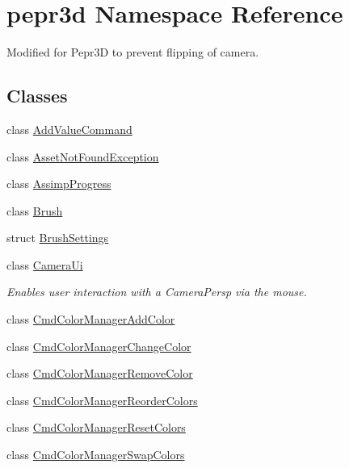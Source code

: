\hypertarget{namespacepepr3d}{}\section{pepr3d Namespace Reference}
\label{namespacepepr3d}


Modified for Pepr3D to prevent flipping of camera.  


\subsection*{Classes}
\begin{DoxyCompactItemize}
\item 
class \mbox{\hyperlink{classpepr3d_1_1_add_value_command}{Add\+Value\+Command}}
\item 
class \mbox{\hyperlink{classpepr3d_1_1_asset_not_found_exception}{Asset\+Not\+Found\+Exception}}
\item 
class \mbox{\hyperlink{classpepr3d_1_1_assimp_progress}{Assimp\+Progress}}
\item 
class \mbox{\hyperlink{classpepr3d_1_1_brush}{Brush}}
\item 
struct \mbox{\hyperlink{structpepr3d_1_1_brush_settings}{Brush\+Settings}}
\item 
class \mbox{\hyperlink{classpepr3d_1_1_camera_ui}{Camera\+Ui}}
\begin{DoxyCompactList}\small\item\em Enables user interaction with a Camera\+Persp via the mouse. \end{DoxyCompactList}\item 
class \mbox{\hyperlink{classpepr3d_1_1_cmd_color_manager_add_color}{Cmd\+Color\+Manager\+Add\+Color}}
\item 
class \mbox{\hyperlink{classpepr3d_1_1_cmd_color_manager_change_color}{Cmd\+Color\+Manager\+Change\+Color}}
\item 
class \mbox{\hyperlink{classpepr3d_1_1_cmd_color_manager_remove_color}{Cmd\+Color\+Manager\+Remove\+Color}}
\item 
class \mbox{\hyperlink{classpepr3d_1_1_cmd_color_manager_reorder_colors}{Cmd\+Color\+Manager\+Reorder\+Colors}}
\item 
class \mbox{\hyperlink{classpepr3d_1_1_cmd_color_manager_reset_colors}{Cmd\+Color\+Manager\+Reset\+Colors}}
\item 
class \mbox{\hyperlink{classpepr3d_1_1_cmd_color_manager_swap_colors}{Cmd\+Color\+Manager\+Swap\+Colors}}
\item 

\end{DoxyCompactItemize}
